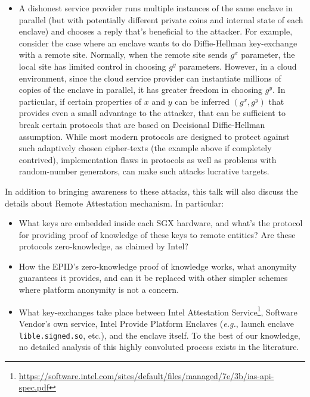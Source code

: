 \documentclass[11pt]{article}
\begin{document}
\begin{itemize}
        \item A dishonest service provider runs multiple instances of
          the same enclave in parallel (but with potentially different
          private coins and internal state of each enclave) and
          chooses a reply that's beneficial to the attacker. For
          example, consider the case where an enclave wants to do
          Diffie-Hellman key-exchange with a remote site. Normally,
          when the remote site sends $g^x$ parameter, the local site
          has limited control in choosing $g^y$ parameters. However,
          in a cloud environment, since the cloud service provider can
          instantiate millions of copies of the enclave in parallel,
          it has greater freedom in choosing $g^y$. In particular, if
          certain properties of $x$ and $y$ can be inferred $(g^x,
          g^y)$ that provides even a small advantage to the attacker,
          that can be sufficient to break certain protocols that are
          based on Decisional Diffie-Hellman assumption. While most
          modern protocols are designed to protect against such
          adaptively chosen cipher-texts (the example above if
          completely contrived), implementation flaws in protocols as
          well as problems with random-number generators, can make
          such attacks lucrative targets.

    \end{itemize}

    In addition to bringing awareness to these attacks, this talk will
    also discuss the details about Remote Attestation mechanism. In
    particular:

    \begin{itemize}

        \item What keys are embedded inside each SGX hardware, and
          what's the protocol for providing proof of knowledge of
          these keys to remote entities? Are these protocols
          zero-knowledge, as claimed by Intel?

        \item How the EPID's \cite{epid} zero-knowledge proof of
          knowledge works, what anonymity guarantees it provides, and
          can it be replaced with other simpler schemes where platform
          anonymity is not a concern.

        \item What key-exchanges take place between Intel Attestation
          Service\footnote{
            \url{https://software.intel.com/sites/default/files/managed/7e/3b/ias-api-spec.pdf}
          }, Software Vendor's own service, Intel Provide Platform
          Enclaves (\textit{e.g.}, launch enclave
          \texttt{lible.signed.so}, etc.), and the enclave itself. To
          the best of our knowledge, no detailed analysis of this
          highly convoluted process exists in the literature.

    \end{itemize}
\end{document}
